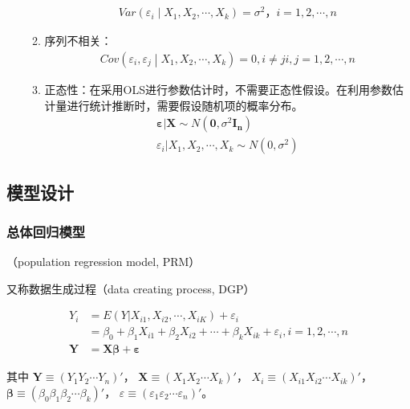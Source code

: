 \documentclass[12pt]{book}
\begin{document}
\begin{enumerate}[1.]
\begin{enumerate}[(1)]
                    \begin{gather*}
                        Var\left(\varepsilon_i\middle| X_1,X_2,\cdots,X_k\right)=\sigma^2，i=1,2,\cdots,n
                    \end{gather*}
              \item 序列不相关：
                    \begin{gather*}
                        Cov\left (\varepsilon_i,\varepsilon_j\middle| X_1,X_2,\cdots,X_k\right)=0,i\neq j  i,j=1,2,\cdots,n
                    \end{gather*}
              \item 正态性：在采用OLS进行参数估计时，不需要正态性假设。在利用参数估计量进行统计推断时，需要假设随机项的概率分布。
                    \begin{gather*}
                        \bm{\varepsilon}|\mathbf{X}\sim N(\mathbf{0},\sigma^2\mathbf{I_n})\\
                        \varepsilon_i|X_1,X_2,\cdots,X_k\sim N(0,\sigma^2)
                    \end{gather*}
          \end{enumerate}
\end{enumerate}



\subsection{模型设计}

\subsubsection{总体回归模型}

（population regression model, PRM）

又称数据生成过程（data creating process, DGP）

\begin{align*}
Y_{i} &= E(Y|X_{i1},X_{i2},\cdots,X_{iK})+\varepsilon_{i}\\ 
&=\beta_{0} + \beta_{1}X_{i1}+\beta_{2}X_{i2}+\cdots+\beta_{k}X_{ik}+\varepsilon_{i}, i=1,2,⋯,n\\ 
\bm{Y}&=\bm{X\beta}+\bm{\varepsilon}
\end{align*}


其中
$\bm{Y}\equiv (Y_{1} Y_{2} \cdots  Y_{n})'$，
$\bm{X}\equiv (X_{1} X_{2} \cdots X_{k})'$，
$X_{i}\equiv (X_{i1} X_{i2} ⋯ X_{ik})'$，
$\bm{\beta}\equiv (\beta_{0} \beta_{1} \beta_{2} \cdots \beta_{k})'$，
$\varepsilon \equiv (\varepsilon_{1} \varepsilon_{2} \cdots \varepsilon_{n})'$。
\end{document}
